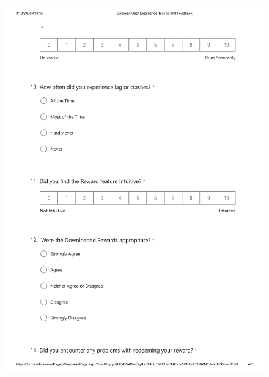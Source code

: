 \documentclass{l4proj}
\begin{document}
\begin{appendices}
\begin{figure}[h]
    \centering
    \includegraphics[height=20cm]{images/Cheyyan User Experience Testing and Feedback-4.png}
\end{figure}


\end{appendices}
\end{document}
